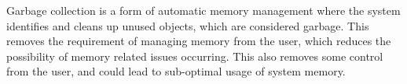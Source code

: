 Garbage collection is a form of automatic memory management where the system identifies and cleans up unused objects, which are considered garbage. This removes the requirement of managing memory from the user, which reduces the possibility of memory related issues occurring. This also removes some control from the user, and could lead to sub-optimal usage of system memory.  

